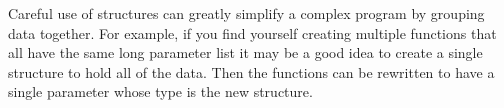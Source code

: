 Careful use of structures can greatly simplify a complex program by grouping data together.  For example, if you find yourself creating multiple functions that all have the same long parameter list it may be a good idea to create a single structure to hold all of the data.  Then the functions can be rewritten to have a single parameter whose type is the new structure. 



